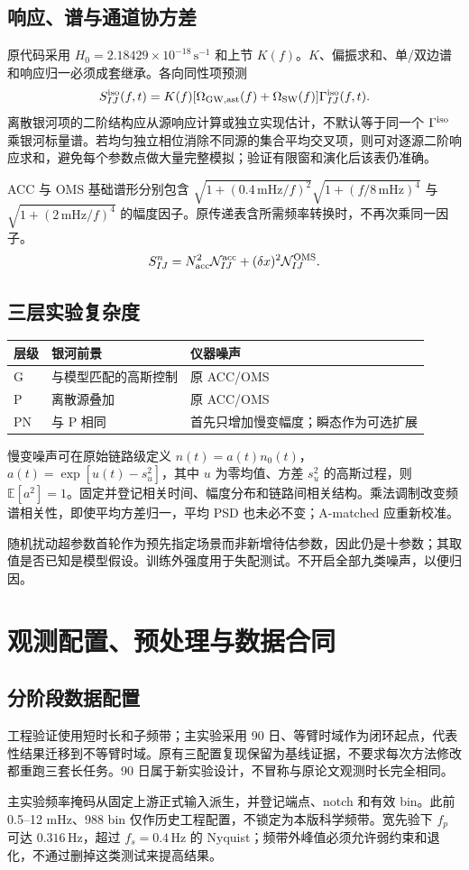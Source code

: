 \documentclass[UTF8,fontset=none,a4paper,11pt]{ctexart}
\newcommand{\E}{\mathbb E}\newcommand{\R}{\mathbb R}\newcommand{\tr}{\operatorname{tr}}
\newcommand{\chapterpage}[1]{\section{#1}}
\begin{document}
\subsection{响应、谱与通道协方差}
原代码采用 $H_0=2.18429\times10^{-18}\,\mathrm{s^{-1}}$ 和上节 $K(f)$。$K$、偏振求和、单/双边谱和响应归一必须成套继承。各向同性项预测
\begin{equation}
S^{\rm iso}_{IJ}(f,t)=K(f)[\Omega_{\mathrm{GW,ast}}(f)+\Omega_{\mathrm{SW}}(f)]\Gamma^{\rm iso}_{IJ}(f,t).
\end{equation}
离散银河项的二阶结构应从源响应计算或独立实现估计，不默认等于同一个 $\Gamma^{\rm iso}$ 乘银河标量谱。若均匀独立相位消除不同源的集合平均交叉项，则可对逐源二阶响应求和，避免每个参数点做大量完整模拟；验证有限窗和演化后该表仍准确。
\par ACC 与 OMS 基础谱形分别包含 $\sqrt{1+(0.4\,\mathrm{mHz}/f)^2}\sqrt{1+(f/8\,\mathrm{mHz})^4}$ 与 $\sqrt{1+(2\,\mathrm{mHz}/f)^4}$ 的幅度因子。原传递表含所需频率转换时，不再次乘同一因子。
\begin{equation}
S_{IJ}^{n}= N_{\rm acc}^{2}\mathcal N^{\rm acc}_{IJ}
+(\delta x)^2\mathcal N^{\rm OMS}_{IJ}.
\end{equation}
\subsection{三层实验复杂度}
\par\noindent
\begin{tabularx}{\linewidth}{p{16mm}YY}\toprule
层级 & 银河前景 & 仪器噪声\\\midrule
G & 与模型匹配的高斯控制 & 原 ACC/OMS\\
P & 离散源叠加 & 原 ACC/OMS\\
PN & 与 P 相同 & 首先只增加慢变幅度；瞬态作为可选扩展\\\bottomrule
\end{tabularx}
\par 慢变噪声可在原始链路级定义 $n(t)=a(t)n_0(t)$，$a(t)=\exp[u(t)-s_u^2]$，其中 $u$ 为零均值、方差 $s_u^2$ 的高斯过程，则 $\E[a^2]=1$。固定并登记相关时间、幅度分布和链路间相关结构。乘法调制改变频谱相关性，即使平均方差归一，平均 PSD 也未必不变；A-matched 应重新校准。
\par 随机扰动超参数首轮作为预先指定场景而非新增待估参数，因此仍是十参数；其取值是否已知是模型假设。训练外强度用于失配测试。不开启全部九类噪声，以便归因。
\chapterpage{观测配置、预处理与数据合同}
\subsection{分阶段数据配置}
工程验证使用短时长和子频带；主实验采用 90 日、等臂时域作为闭环起点，代表性结果迁移到不等臂时域。原有三配置复现保留为基线证据，不要求每次方法修改都重跑三套长任务。90 日属于新实验设计，不冒称与原论文观测时长完全相同。
\par 主实验频率掩码从固定上游正式输入派生，并登记端点、notch 和有效 bin。此前 0.5--12 mHz、988 bin 仅作历史工程配置，不锁定为本版科学频带。宽先验下 $f_p$ 可达 $0.316\,\mathrm{Hz}$，超过 $f_s=0.4\,\mathrm{Hz}$ 的 Nyquist；频带外峰值必须允许弱约束和退化，不通过删掉这类测试来提高结果。
\end{document}
